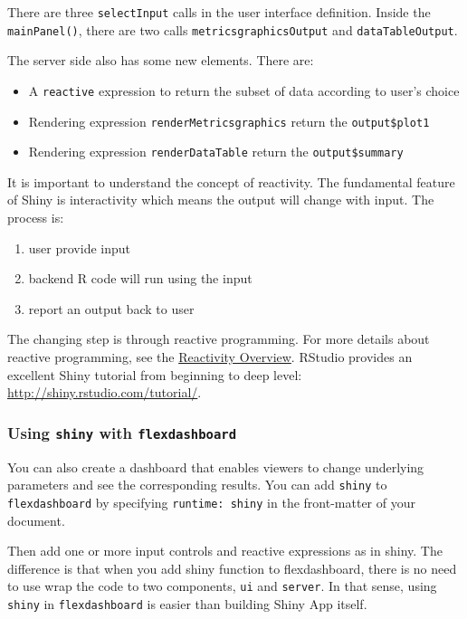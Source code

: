 \documentclass[
]{article}
\providecommand{\tightlist}{%
  \setlength{\itemsep}{0pt}\setlength{\parskip}{0pt}}
\begin{document}
There are three \texttt{selectInput} calls in the user interface
definition. Inside the \texttt{mainPanel()}, there are two calls
\texttt{metricsgraphicsOutput} and \texttt{dataTableOutput}.

The server side also has some new elements. There are:

\begin{itemize}
\tightlist
\item
  A \texttt{reactive} expression to return the subset of data according
  to user's choice
\item
  Rendering expression \texttt{renderMetricsgraphics} return the
  \texttt{output\$plot1}
\item
  Rendering expression \texttt{renderDataTable} return the
  \texttt{output\$summary}
\end{itemize}

It is important to understand the concept of reactivity. The fundamental
feature of Shiny is interactivity which means the output will change
with input. The process is:

\begin{enumerate}
\def\labelenumi{\arabic{enumi}.}
\tightlist
\item
  user provide input
\item
  backend R code will run using the input
\item
  report an output back to user
\end{enumerate}

The changing step is through reactive programming. For more details
about reactive programming, see the
\href{http://shiny.rstudio.com/articles/reactivity-overview.html}{Reactivity
Overview}. RStudio provides an excellent Shiny tutorial from beginning
to deep level: \url{http://shiny.rstudio.com/tutorial/}.

\hypertarget{using-shiny-with-flexdashboard}{%
\subsubsection{\texorpdfstring{Using \texttt{shiny} with
\texttt{flexdashboard}}{Using shiny with flexdashboard}}\label{using-shiny-with-flexdashboard}}

You can also create a dashboard that enables viewers to change
underlying parameters and see the corresponding results. You can add
\texttt{shiny} to \texttt{flexdashboard} by specifying
\texttt{runtime:\ shiny} in the front-matter of your document.

Then add one or more input controls and reactive expressions as in
shiny. The difference is that when you add shiny function to
flexdashboard, there is no need to use wrap the code to two components,
\texttt{ui} and \texttt{server}. In that sense, using \texttt{shiny} in
\texttt{flexdashboard} is easier than building Shiny App itself.
\end{document}
